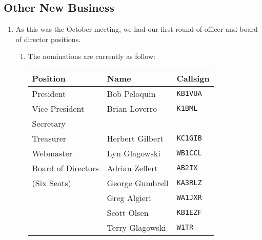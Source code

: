 \documentclass[10pt,letterpaper]{article}
\begin{document}
\subsection{Other New Business}
\begin{enumerate}
  \item As this was the October meeting, we had our first round of officer and board of director positions.
  \begin{enumerate}
  \item The nominations are currently as follow:\\
    \begin{tabular}{|l|l|l|}
      \hline
      \textbf{Position}  & \textbf{Name}     & \textbf{Callsign} \\ \hline
      President          & Bob Peloquin      & \texttt{KB1VUA}   \\ \hline
      Vice President     & Brian Loverro     & \texttt{K1BML}    \\ \hline
      Secretary          &                   &                   \\ \hline
      Treasurer          & Herbert Gilbert   & \texttt{KC1GIB}   \\ \hline
      Webmaster          & Lyn Glagowski     & \texttt{WB1CCL}   \\ \hline
      Board of Directors & Adrian Zeffert    & \texttt{AB2IX}    \\
      (Six Seats)        & George Gumbrell   & \texttt{KA3RLZ}   \\
                         & Greg Algieri      & \texttt{WA1JXR}   \\
                         & Scott Olsen       & \texttt{KB1EZF}   \\
                         & Terry Glagowski   & \texttt{W1TR}     \\ \hline


\end{tabular}
\end{enumerate}
\end{enumerate}
\end{document}
